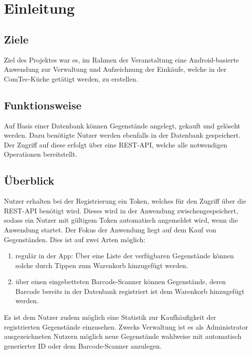 \section{Einleitung}\label{sec:einleitung}

\subsection{Ziele}\label{subsec:ziele}

Ziel des Projektes war es, im Rahmen der Veranstaltung  eine Android-basierte Anwendung zur Verwaltung und Aufzeichnung der Einkäufe, welche in der ComTec-Küche getätigt werden, zu erstellen.

\subsection{Funktionsweise}\label{subsec:funktionsweise}

Auf Basis einer Datenbank können Gegenstände angelegt, gekauft und gelöscht werden.
Dazu benötigte Nutzer werden ebenfalls in der Datenbank gespeichert.
Der Zugriff auf diese erfolgt über eine REST-API, welche alle notwendigen Operationen bereitstellt.

\subsection{Überblick}\label{subsec:überblick}

Nutzer erhalten bei der Registrierung ein Token, welches für den Zugriff über die REST-API benötigt wird.
Dieses wird in der Anwendung zwischengespeichert, sodass ein Nutzer mit gültigem Token automatisch angemeldet wird, wenn die Anwendung startet.
Der Fokus der Anwendung liegt auf dem Kauf von Gegenständen.
Dies ist auf zwei Arten möglich:

\begin{enumerate}
	\item regulär in der App: Über eine Liste der verfügbaren Gegenstände können solche durch Tippen zum Warenkorb hinzugefügt werden.

	\item über einen eingebetteten Barcode-Scanner können Gegenstände, deren Barcode bereits in der Datenbank registriert ist dem Warenkorb hinzugefügt werden.
\end{enumerate}

Es ist dem Nutzer zudem möglich eine Statistik zur Kaufhäufigkeit der registrierten Gegenstände einzusehen.
Zwecks Verwaltung ist es als Administrator ausgezeichneten Nutzern möglich neue Gegenstände wahlweise mit automatisch generierter ID oder dem Barcode-Scanner anzulegen.

